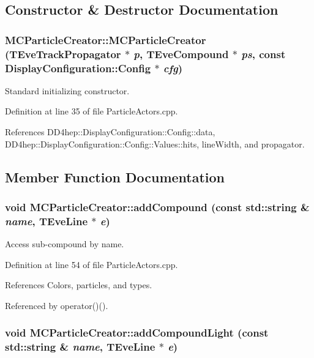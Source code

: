 \subsection{Constructor \& Destructor Documentation}
\hypertarget{struct_d_d4hep_1_1_m_c_particle_creator_a2fcb384a14cbc919c57f6774cf6c20f3}{
\subsubsection[{MCParticleCreator}]{\setlength{\rightskip}{0pt plus 5cm}MCParticleCreator::MCParticleCreator (TEveTrackPropagator $\ast$ {\em p}, \/  TEveCompound $\ast$ {\em ps}, \/  const {\bf DisplayConfiguration::Config} $\ast$ {\em cfg})}}
\label{struct_d_d4hep_1_1_m_c_particle_creator_a2fcb384a14cbc919c57f6774cf6c20f3}


Standard initializing constructor. 

Definition at line 35 of file ParticleActors.cpp.

References DD4hep::DisplayConfiguration::Config::data, DD4hep::DisplayConfiguration::Config::Values::hits, lineWidth, and propagator.

\subsection{Member Function Documentation}
\hypertarget{struct_d_d4hep_1_1_m_c_particle_creator_a282bb825147fa28733679bc6ed5a9afe}{
\subsubsection[{addCompound}]{\setlength{\rightskip}{0pt plus 5cm}void MCParticleCreator::addCompound (const std::string \& {\em name}, \/  TEveLine $\ast$ {\em e})}}
\label{struct_d_d4hep_1_1_m_c_particle_creator_a282bb825147fa28733679bc6ed5a9afe}


Access sub-\/compound by name. 

Definition at line 54 of file ParticleActors.cpp.

References Colors, particles, and types.

Referenced by operator()().\hypertarget{struct_d_d4hep_1_1_m_c_particle_creator_a7b64ce56bb99131d20afbccf27760828}{
\subsubsection[{addCompoundLight}]{\setlength{\rightskip}{0pt plus 5cm}void MCParticleCreator::addCompoundLight (const std::string \& {\em name}, \/  TEveLine $\ast$ {\em e})}}
\label{struct_d_d4hep_1_1_m_c_particle_creator_a7b64ce56bb99131d20afbccf27760828}


